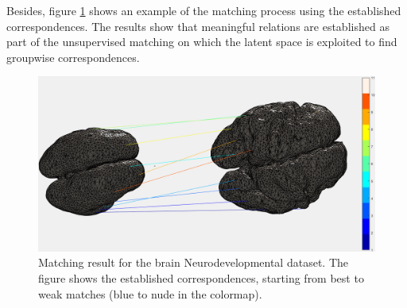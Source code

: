 \documentclass[]{article}
\newcommand{\gD}[2]{\mathcal{N}\left(#1,#2\right)}
\newcommand{\eye}{\mathbf{I}}
\newcommand{\setWv}{\mathbf{W}^{v}}
\newcommand{\setYv}{\mathbf{Y}^{v}}
\newcommand{\setXv}{\mathbf{X}^{v}}
\newcommand{\setZv}{\mathbf{Z}^{v}}
\newcommand{\setFv}{\mathbf{F}^{v}}
\newcommand{\hParams}{\boldsymbol{\theta}}
\begin{document}
Besides, figure \ref{fig:brainBabyM} shows an example of the matching process using the established correspondences. The results show that meaningful relations are established as part of the unsupervised matching on which the latent space is exploited to find groupwise correspondences.
\begin{figure}[ht!]
	\centering
	
	\includegraphics[width=0.7\linewidth]{img/brainBabyMatch}
	\caption{Matching result for the brain Neurodevelopmental dataset.  The figure shows the established correspondences, starting from best to weak matches (blue to nude in the colormap).}
	\label{fig:brainBabyM}
\end{figure}
%
%
%
%
%
%
%




\end{document}
